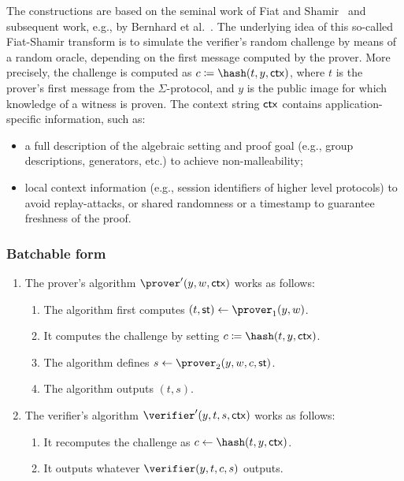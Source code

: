 \documentclass[runningheads]{llncs}
\begin{document}
The constructions are based on the seminal work of Fiat and Shamir~\cite{C:FiaSha86} and subsequent work, e.g., by Bernhard et al.~\cite{AC:BerPerWar12}.
The underlying idea of this so-called Fiat-Shamir transform is to simulate the verifier's random challenge by means of a random oracle, depending on the first message computed by the prover.
More precisely, the challenge is computed as $c\defeq\hash(t,y,\ctx)$, where $t$ is the prover's first message from the $\Sigma$-protocol, and $y$ is the public image for which knowledge of a witness is proven.
The context string $\mathsf{ctx}$ contains application-specific information, such as:
\begin{itemize}
  \item
    a full description of the algebraic setting and proof goal (e.g., group descriptions, generators, etc.) to achieve non-malleability;
  \item
    local context information (e.g., session identifiers of higher level protocols) to avoid replay-attacks, or shared randomness or a timestamp to guarantee freshness of the proof.
\end{itemize}

\subsubsection{Batchable form}


\begin{enumerate}
  \item
    The prover's algorithm $\prover'(y,w,\ctx)$ works as follows:
    \begin{enumerate}
      \item
        The algorithm first computes $(t,\st)\gets\prover_1(y,w)$.
      \item
        It computes the challenge by setting $c\defeq\hash(t,y,\ctx)$.
      \item
        The algorithm defines $s\gets\prover_2(y,w,c,\st)$.
      \item
        The algorithm outputs $(t,s)$.
    \end{enumerate}
  \item
    The verifier's algorithm $\verifier'(y,t,s,\ctx)$ works as follows:
    \begin{enumerate}
      \item
        It recomputes the challenge as $c\gets\hash(t,y,\ctx)$.
      \item
        It outputs whatever $\verifier(y,t,c,s)$ outputs.
    \end{enumerate}
\end{enumerate}
\end{document}
